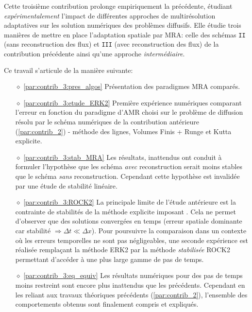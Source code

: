 Cette troisième contribution prolonge empiriquement la précédente,
étudiant \emph{expérimentalement} l'impact de différentes approches de multirésolution adaptatives sur les solution numériques des problèmes diffusifs. 
Elle étudie trois manières de mettre en place l'adaptation spatiale par MRA:
celle des schémas \texttt{II} (sans reconstruction des flux) et
\texttt{III} (avec reconstruction des flux) de la contribution précédente
ainsi qu'une approche \textit{intermédiaire}.\par
Ce travail s'articule de la manière suivante:
\begin{itemize}
\item[$\diamond$]\ref{par:contrib_3:pres_algos} Présentation des paradigmes MRA comparés.
\item[$\diamond$]\ref{par:contrib_3:etude_ERK2} Première expérience numériques comparant l'erreur en fonction du paradigme d'AMR choisi
sur le problème de diffusion résolu par le schéma numériques de la contribution antérieure (\ref{par:contrib_2}) - méthode des lignes, Volumes Finis + Runge et Kutta explicite.
\item[$\diamond$]\ref{par:contrib_3:stab_MRA} Les résultats, inattendus
ont conduit à formuler l'hypothèse que les schéma \emph{avec} reconstruction serait moins stables que le schéma \emph{sans} reconstruction.
Cependant cette hypothèse est invalidée par une étude de stabilité linéaire.
\item[$\diamond$]\ref{par:contrib_3:ROCK2} La principale limite de l'étude antérieure est
la contrainte de stabilités de la méthode explicite imposant . Cela ne permet d'observer que des solutions convergées en temps (erreur spatiale dominante car stabilité $\Rightarrow \Delta t \ll \Delta x$).
Pour poursuivre la comparaison dans un contexte où les erreurs temporelles ne sont pas négligeables, une seconde expérience 
est réalisée remplaçant la méthode ERK2 par la méthode \emph{stabilisée} ROCK2 \cite{abdulle2002fourth} permettant d'accéder à 
une plus large gamme de pas de temps.
\item[$\diamond$]\ref{par:contrib_3:eq_equiv} Les résultats numériques pour des pas de temps moins restreint sont encore plus inattendus que les précédents.
Cependant en les reliant aux travaux théoriques précédents  (\ref{par:contrib_2}), l'ensemble des comportements obtenus sont finalement compris et expliqués.
\end{itemize}